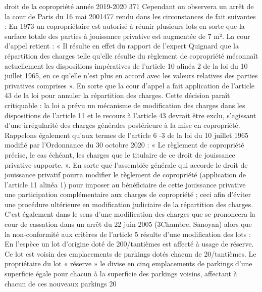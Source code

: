 droit de la copropriété année 2019-2020
371
Cependant on observera un arrêt de la cour de Paris du 16 mai 2001477 rendu dans les circonstances de fait suivantes :
En 1973 un copropriétaire est autorisé à réunir plusieurs lots en sorte que la surface totale des parties à jouissance privative est augmentée de 7 m². La cour d’appel retient :
« Il résulte en effet du rapport de l’expert Quignard que la répartition des charges telle qu’elle résulte du règlement de copropriété méconnaît actuellement les dispositions impératives de l’article 10 alinéa 2 de la loi du 10 juillet 1965, en ce qu’elle n’est plus en accord avec les valeurs relatives des parties privatives comprises ». En sorte que la cour d’appel a fait application de l’article 43 de la loi pour annuler la répartition des charges.
Cette décision paraît critiquable : la loi a prévu un mécanisme de modification des charges dans les dispositions de l’article 11 et le recours à l’article 43 devrait être exclu, s’agissant d’une irrégularité des charges générales postérieure à la mise en copropriété.
Rappelons également qu’aux termes de l’article 6 -3 de la loi du 10 juillet 1965 modifié par l’Ordonnance du 30 octobre 2020 : « Le règlement de copropriété précise, le cas échéant, les charges que le titulaire de ce droit de jouissance privative supporte. ». En sorte que l’assemblée générale qui accorde le droit de jouissance privatif pourra modifier le règlement de copropriété (application de l’article 11 alinéa 1) pour imposer au bénéficiaire de cette jouissance privative une participation complémentaire aux charges de copropriété ; ceci afin d’éviter une procédure ultérieure en modification judiciaire de la répartition des charges.
C’est également dans le sens d’une modification des charges que se prononcera la cour de cassation dans un arrêt du 22 juin 2005 (3\degres Chambre, Sanoyan) alors que la non-conformité aux critères de l’article 5 résulte d’une modification des lots :
En l’espèce un lot d’origine doté de 200/tantièmes est affecté à usage de réserve. Ce lot est voisin des emplacements de parkings dotés chacun de 20/tantièmes. Le propriétaire du lot « réserve » le divise en cinq emplacements de parkings d’une superficie égale pour chacun à la superficie des parkings voisins, affectant à chacun de ces nouveaux parkings 20 %
